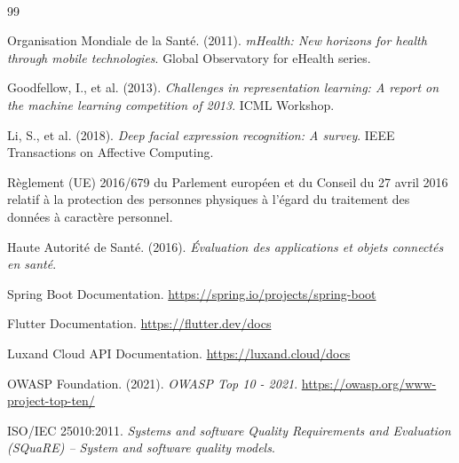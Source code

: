 \documentclass[a4paper,11pt]{report}
\begin{document}

\

\begin{thebibliography}{99}

    Organisation Mondiale de la Santé. (2011). \textit{mHealth: New horizons for health through mobile technologies}. Global Observatory for eHealth series.

    Goodfellow, I., et al. (2013). \textit{Challenges in representation learning: A report on the machine learning competition of 2013}. ICML Workshop.

    Li, S., et al. (2018). \textit{Deep facial expression recognition: A survey}. IEEE Transactions on Affective Computing.

    Règlement (UE) 2016/679 du Parlement européen et du Conseil du 27 avril 2016 relatif à la protection des personnes physiques à l'égard du traitement des données à caractère personnel.

    Haute Autorité de Santé. (2016). \textit{Évaluation des applications et objets connectés en santé}.

    Spring Boot Documentation. \url{https://spring.io/projects/spring-boot}

    Flutter Documentation. \url{https://flutter.dev/docs}

    \bibitem{luxand}
    Luxand Cloud API Documentation. \url{https://luxand.cloud/docs}

    OWASP Foundation. (2021). \textit{OWASP Top 10 - 2021}. \url{https://owasp.org/www-project-top-ten/}

    ISO/IEC 25010:2011. \textit{Systems and software Quality Requirements and Evaluation (SQuaRE) -- System and software quality models}.

\end{thebibliography}

\appendix
\clearpage %

\end{document}
